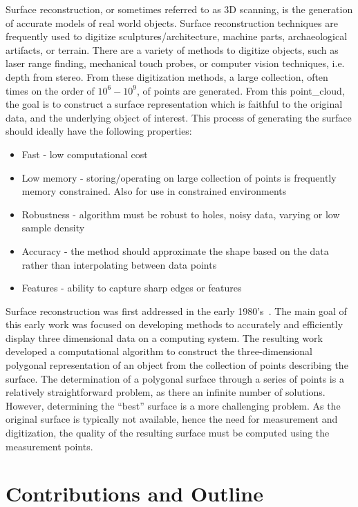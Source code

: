 Surface reconstruction, or sometimes referred to as 3D scanning, is the generation of accurate models of real world objects.
Surface reconstruction techniques are frequently used to digitize sculptures/architecture, machine parts, archaeological artifacts, or terrain.
There are a variety of methods to digitize objects, such as laser range finding, mechanical touch probes, or computer vision techniques, i.e. depth from stereo.
From these digitization methods, a large collection, often times on the order of \( 10^6 - 10^9\), of points are generated.
From this \gls{point_cloud}, the goal is to construct a surface representation which is faithful to the original data, and the underlying object of interest.
This process of generating the surface should ideally have the following properties:
\begin{itemize}
    \item Fast - low computational cost
    \item Low memory - storing/operating on large collection of points is frequently memory constrained. Also for use in constrained environments
    \item Robustness - algorithm must be robust to holes, noisy data, varying or low sample density
    \item Accuracy - the method should approximate the shape based on the data rather than interpolating between data points
    \item Features - ability to capture sharp edges or features
\end{itemize}

Surface reconstruction was first addressed in the early 1980's~\cite{uselton1983,uselton1981}.
The main goal of this early work was focused on developing methods to accurately and efficiently display three dimensional data on a computing system.
The resulting work developed a computational algorithm to construct the three-dimensional polygonal representation of an object from the collection of points describing the surface.
The determination of a polygonal surface through a series of points is a relatively straightforward problem, as there an infinite number of solutions.
However, determining the ``best'' surface is a more challenging problem.
As the original surface is typically not available, hence the need for measurement and digitization, the quality of the resulting surface must be computed using the measurement points.

\section{Contributions and Outline}

